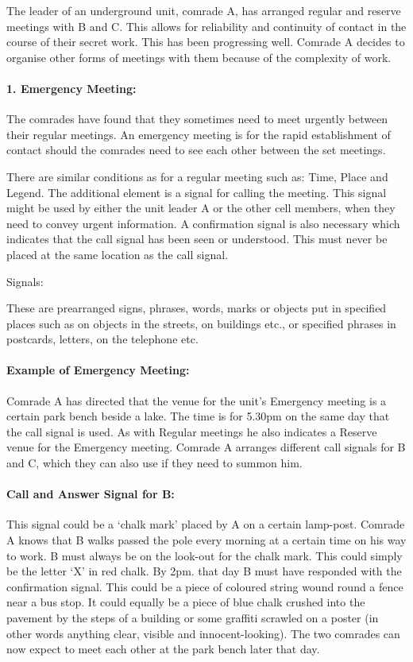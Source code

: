 The leader of an underground unit, comrade A, has arranged regular and
reserve meetings with B and C. This allows for reliability and
continuity of contact in the course of their secret work. This has been
progressing well. Comrade A decides to organise other forms of meetings
with them because of the complexity of work.

\paragraph{1. Emergency Meeting:}

The comrades have found that they sometimes need to meet urgently
between their regular meetings. An emergency meeting is for the rapid
establishment of contact should the comrades need to see each other
between the set meetings.

There are similar conditions as for a regular meeting such as: Time,
Place and Legend. The additional element is a signal for calling the
meeting. This signal might be used by either the unit leader A or the
other cell members, when they need to convey urgent information. A
confirmation signal is also necessary which indicates that the call
signal has been seen or understood. This must never be placed at the
same location as the call signal.

{Signals:}

These are prearranged signs, phrases, words, marks or objects put in
specified places such as on objects in the streets, on buildings etc.,
or specified phrases in postcards, letters, on the telephone etc.

\paragraph{Example of Emergency Meeting:}

Comrade A has directed that the venue for the unit's Emergency meeting
is a certain park bench beside a lake. The time is for 5.30pm on the
same day that the call signal is used. As with Regular meetings he also
indicates a Reserve venue for the Emergency meeting. Comrade A arranges
different call signals for B and C, which they can also use if they need
to summon him.

\paragraph{Call and Answer Signal for B:}

This signal could be a `chalk mark' placed by A on a certain lamp-post.
Comrade A knows that B walks passed the pole every morning at a certain
time on his way to work. B must always be on the look-out for the chalk
mark. This could simply be the letter `X' in red chalk. By 2pm. that day
B must have responded with the confirmation signal. This could be a
piece of coloured string wound round a fence near a bus stop. It could
equally be a piece of blue chalk crushed into the pavement by the steps
of a building or some graffiti scrawled on a poster (in other words
anything clear, visible and innocent-looking). The two comrades can now
expect to meet each other at the park bench later that day.

